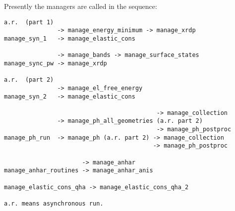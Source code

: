 \documentclass[12pt,a4paper,twoside]{report}
\begin{document}
Presently the managers are called in the sequence:
\begin{verbatim}
a.r.  (part 1)
               -> manage_energy_minimum -> manage_xrdp
manage_syn_1   -> manage_elastic_cons

               -> manage_bands -> manage_surface_states
manage_sync_pw -> manage_xrdp

a.r.  (part 2)
               -> manage_el_free_energy
manage_syn_2   -> manage_elastic_cons

                                           -> manage_collection
               -> manage_ph_all_geometries (a.r. part 2) 
                                           -> manage_ph_postproc
manage_ph_run  -> manage_ph (a.r. part 2) -> manage_collection
                                          -> manage_ph_postproc

                      -> manage_anhar
manage_anhar_routines -> manage_anhar_anis

manage_elastic_cons_qha -> manage_elastic_cons_qha_2

a.r. means asynchronous run.
\end{verbatim}
\end{document}
